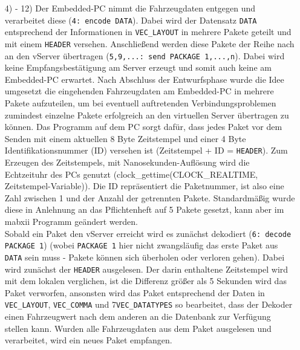 \documentclass[fontsize = 12pt, paper = a4]{scrreprt}
\begin{document}
\begin{itemize}
\item[4) - 12)]
Der Embedded-PC nimmt die Fahrzeugdaten entgegen und verarbeitet diese (\texttt{4: encode DATA}). Dabei wird der Datensatz \texttt{DATA} entsprechend der Informationen in \texttt{VEC\_LAYOUT} in mehrere Pakete geteilt und mit einem \texttt{HEADER} versehen. Anschließend werden diese Pakete der Reihe nach an den vServer übertragen (\texttt{5,9,...: send PACKAGE 1,...,n}). Dabei wird keine Empfangsbestätigung am Server erzeugt und somit auch keine am Embedded-PC erwartet. 
Nach Abschluss der Entwurfsphase wurde die Idee umgesetzt die eingehenden Fahrzeugdaten am Embedded-PC in mehrere Pakete aufzuteilen, um bei eventuell auftretenden Verbindungsproblemen zumindest einzelne Pakete erfolgreich an den virtuellen Server übertragen zu können. Das Programm auf dem PC sorgt dafür, dass jedes Paket vor dem Senden mit einem aktuellen 8 Byte Zeitstempel und einer 4 Byte Identifikationsnummer (ID) versehen ist (Zeitstempel + ID = \texttt{HEADER}). Zum Erzeugen des Zeitstempels, mit Nanosekunden-Auflösung wird die Echtzeituhr des PCs genutzt (clock\_gettime(CLOCK\_REALTIME, Zeitstempel-Variable)). Die ID repräsentiert die Paketnummer, ist also eine Zahl zwischen 1 und der Anzahl der getrennten Pakete. Standardmäßig wurde diese in Anlehnung an das Pflichtenheft auf 5 Pakete gesetzt, kann aber im mabxii Programm geändert werden. \\
Sobald ein Paket den vServer erreicht wird es zunächst dekodiert (\texttt{6: decode PACKAGE 1}) (wobei \texttt{PACKAGE 1} hier nicht zwangsläufig das erste Paket aus \texttt{DATA} sein muss - Pakete können sich überholen oder verloren gehen). Dabei wird zunächst der \texttt{HEADER} ausgelesen. Der darin enthaltene Zeitstempel wird mit dem lokalen verglichen, ist die Differenz größer als 5 Sekunden wird das Paket verworfen, ansonsten wird das Paket entsprechend der Daten in \texttt{VEC\_LAYOUT}, \texttt{VEC\_COMMA} und 7\texttt{VEC\_DATATYPES} so bearbeitet, dass der Dekoder einen Fahrzeugwert nach dem anderen an die Datenbank zur Verfügung stellen kann. Wurden alle Fahrzeugdaten aus dem Paket ausgelesen und verarbeitet, wird ein neues Paket empfangen. 


\end{itemize}
\end{document}
